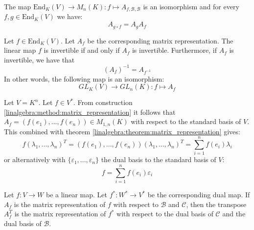 	\begin{theorem}\label{linalgebra:theorem:matrix_composition_end}
	        The map $\text{End}_K(V)\rightarrow M_n(K):f\mapsto A_{f, \mathcal{B}, \mathcal{B}}$ is an isomorphism and for every $f,g\in\text{End}_K(V)$ we have:
        	\begin{equation}
			A_{g\circ f} = A_gA_f
		\end{equation}
	\end{theorem}
	
        \begin{theorem}\label{linalgebra:matrix_invertable_map}
	        Let $f\in\text{End}_K(V)$. Let $A_f$ be the corresponding matrix representation. The linear map $f$ is invertible if and only if $A_f$ is invertible. Furthermore, if $A_f$ is invertible, we have that \[\left(A_f\right)^{-1} = A_{f^{-1}}\] In other words, the following map is an isomorphism\footnotemark:
	        \begin{equation}
	        	GL_K(V)\rightarrow GL_n(K):f\mapsto A_f
	        \end{equation}
	\end{theorem}
        
        \begin{theorem}
		Let $V = K^n$. Let $f\in V^*$. From construction \ref{linalgebra:method:matrix_representation} it follows that $A_f = (f(e_1), ..., f(e_n))\in M_{1,n}(K)$ with respect to the standard basis of $V$. This combined with theorem \ref{linalgebra:theorem:matrix_representation} gives:
	        \begin{equation}
			f(\lambda_1, ..., \lambda_n)^T = (f(e_1), ..., f(e_n))(\lambda_1, ..., \lambda_n)^T = \sum_{i=1}^nf(e_i)\lambda_i
		\end{equation}
        	or alternatively with $\{\varepsilon_1, ..., \varepsilon_n\}$ the dual basis to the standard basis of $V$:
	        \begin{equation}
        	    	\label{linalgebra:map_in_function_of_dual_basis}
			\boxed{f = \sum_{i=1}^nf(e_i)\varepsilon_i}
		\end{equation}
	\end{theorem}
        
        \begin{theorem}
		Let $f:V\rightarrow W$ be a linear map. Let $f^*:W^*\rightarrow V^*$ be the corresponding dual map. If $A_f$ is the matrix representation of $f$ with respect to $\mathcal{B}$ and $\mathcal{C}$, then the transpose $A_f^T$ is the matrix representation of $f^*$ with respect to the dual basis of $\mathcal{C}$ and the dual basis of $\mathcal{B}$.
	\end{theorem}
        
